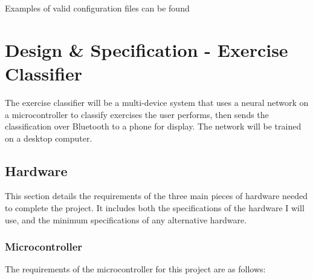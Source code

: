 \documentclass[a4paper]{article}
\begin{document}
Examples of valid configuration files can be found 

\newpage
\section{Design \& Specification - Exercise Classifier}

The exercise classifier will be a multi-device system that uses a neural network on a microcontroller to classify exercises the user performs, then sends the classification over Bluetooth to a phone for display. The network will be trained on a desktop computer.

\subsection{Hardware}%

This section details the requirements of the three main pieces of hardware needed to complete the project. It includes both the specifications of the hardware I will use, and the minimum specifications of any alternative hardware.

\subsubsection{Microcontroller}

The requirements of the microcontroller for this project are as follows:

\end{document}

